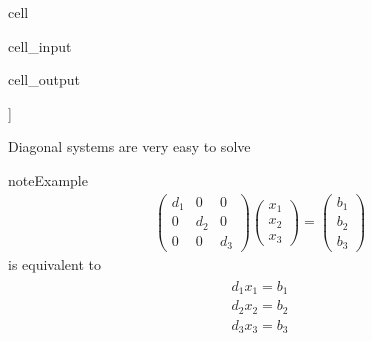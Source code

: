 \documentclass[letterpaper,10pt,english]{jupyterBook}
\begin{document}
\begin{sphinxuseclass}{cell}\begin{sphinxVerbatimInput}

\begin{sphinxuseclass}{cell_input}
\begin{sphinxVerbatim}[commandchars=\\\{\}]
   
      
\end{sphinxVerbatim}

\end{sphinxuseclass}\end{sphinxVerbatimInput}
\begin{sphinxVerbatimOutput}

\begin{sphinxuseclass}{cell_output}
\begin{sphinxVerbatim}[commandchars=\\\{\}]
[[ 2  0  0  0  0]
 [ 0  4  0  0  0]
 [ 0  0  6  0  0]
 [ 0  0  0  8  0]
 [ 0  0  0  0 10]]
\end{sphinxVerbatim}

\end{sphinxuseclass}\end{sphinxVerbatimOutput}

\end{sphinxuseclass}
\sphinxAtStartPar
Diagonal systems are very easy to solve

\begin{sphinxadmonition}{note}{Example}
\begin{equation*}
\begin{split}
%
\begin{pmatrix}
d_1 & 0 & 0 \\
0 & d_2 & 0 \\
0 & 0 & d_3 
\end{pmatrix}
\begin{pmatrix}
x_1 \\
x_2 \\
x_3 
\end{pmatrix}
=
\begin{pmatrix}
b_1 \\
b_2 \\
b_3 
\end{pmatrix}
%
\end{split}
\end{equation*}
\sphinxAtStartPar
is equivalent to
\begin{equation*}
\begin{split}
%
\begin{array}{c}
d_1 x_1 = b_1 \\
d_2x_2 = b_2 \\
d_3 x_3 = b_3
\end{array}
%
\end{split}
\end{equation*}\end{sphinxadmonition}
\end{document}
